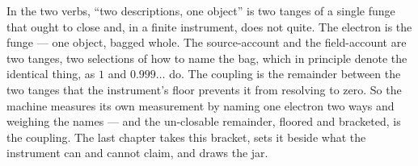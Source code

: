 In the two verbs, ``two descriptions, one object'' is two tanges of a single funge that ought to close and, in a finite
instrument, does not quite. The electron is the funge --- one object, bagged whole. The source-account and the field-account
are two tanges, two selections of how to name the bag, which in principle denote the identical thing, as $1$ and
$0.999\ldots$ do. The coupling is the remainder between the two tanges that the instrument's floor prevents it from resolving
to zero. So the machine measures its own measurement by naming one electron two ways and weighing the names --- and the
un-closable remainder, floored and bracketed, is the coupling. The last chapter takes this bracket, sets it beside what the
instrument can and cannot claim, and draws the jar.
